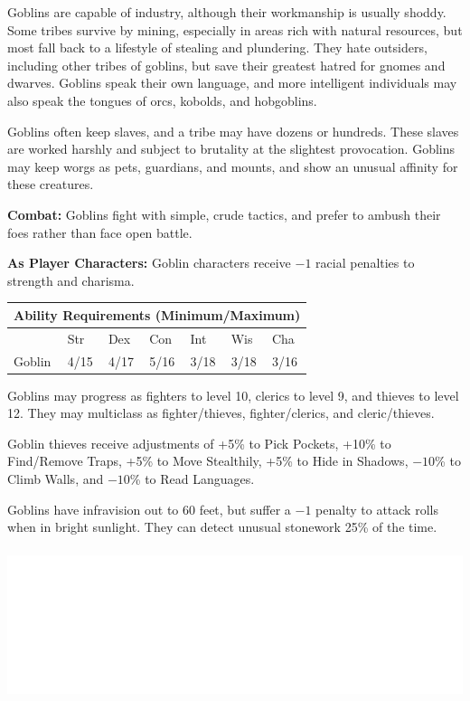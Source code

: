 \begin{multicols}{2}
Goblins are capable of industry, although their workmanship is usually shoddy. Some tribes survive by mining, especially in areas rich with natural resources, but most fall back to a lifestyle of stealing and plundering. They hate outsiders, including other tribes of goblins, but save their greatest hatred for gnomes and dwarves. Goblins speak their own language, and more intelligent individuals may also speak the tongues of orcs, kobolds, and hobgoblins.

Goblins often keep slaves, and a tribe may have dozens or hundreds. These slaves are worked harshly and subject to brutality at the slightest provocation. Goblins may keep worgs as pets, guardians, and mounts, and show an unusual affinity for these creatures.

\textbf
{Combat:} Goblins fight with simple, crude tactics, and prefer to ambush their foes rather than face open battle.

\textbf{As Player Characters:} Goblin characters receive $-1$ racial penalties to strength and charisma.

\noindent \begin{minipage}{\columnwidth}

\noindent \begin{tabular}{|p{}|p{}|p{}|p{}|p{}|p{}|p{}|}
\multicolumn{7}{c}{Ability Requirements (Minimum/Maximum)} \\
\hline
	& Str	& Dex	& Con	& Int	& Wis	& Cha	\\
\hline\hline
\rowcolor[gray]{.9}Goblin	& 4/15	& 4/17	& 5/16	& 3/18	& 3/18	& 3/16	\\
\hline
\end{tabular}

\end{minipage}

Goblins may progress as fighters to level 10, clerics to level 9, and thieves to level 12. They may multiclass as fighter/thieves, fighter/clerics, and cleric/thieves.

Goblin thieves receive adjustments of +5\% to Pick Pockets, +10\% to Find/Remove Traps, +5\% to Move Stealthily, +5\% to Hide in Shadows, $-10$\% to Climb Walls, and $-10$\% to Read Languages.

Goblins have infravision out to 60 feet, but suffer a $-1$ penalty to attack rolls when in bright sunlight. They can detect unusual stonework 25\% of the time.

\noindent\includegraphics[width=\columnwidth, height=1.75in]{testblock.pdf}


\end{multicols}
